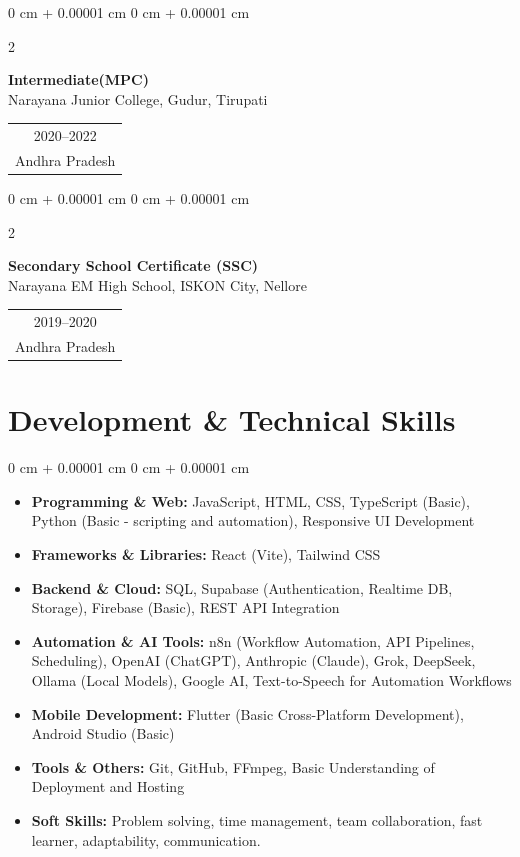 \documentclass[10pt, a4paper]{article}
\makeatletter
\newenvironment{highlights}{
    \begin{itemize}[
        topsep=0.06 cm,
        parsep=0.04 cm,
        partopsep=0pt,
        itemsep=0.02 cm,
        leftmargin=0 cm + 10pt
    ]
}{
    \end{itemize}
}
\newenvironment{onecolentry}{
    \begin{adjustwidth}{
        0 cm + 0.00001 cm
    }{
        0 cm + 0.00001 cm
    }
}{
    \end{adjustwidth}
}
\newenvironment{twocolentry}[2][4.5 cm]{
    \onecolentry
    \def\secondColumn{#2}
    \setcolumnwidth{\fill, #1}
    \begin{paracol}{2}
}{
    \switchcolumn \raggedleft \secondColumn
    \end{paracol}
    \endonecolentry
}
\newcommand{\eduDateBlock}[2]{
    \begin{tabular}[t]{@{}c@{}}
        \normalsize #1 \\
        \normalsize #2
    \end{tabular}
}
\makeatother
\begin{document}
    \vspace{0.10 cm}
    \begin{twocolentry}{
        \eduDateBlock{2020--2022}{Andhra Pradesh}
    }
        \textbf{Intermediate(MPC)}\\
        Narayana Junior College, Gudur, Tirupati
    \end{twocolentry}

    \vspace{0.10 cm}
    \begin{twocolentry}{
        \eduDateBlock{2019--2020}{Andhra Pradesh}
    }
        \textbf{Secondary School Certificate (SSC)}\\
        Narayana EM High School, ISKON City, Nellore
    \end{twocolentry}

    \section{Development \& Technical Skills}

    \begin{onecolentry}
        \begin{highlights}
            \item \textbf{Programming \& Web:} JavaScript, HTML, CSS, TypeScript (Basic), Python (Basic - scripting and automation), Responsive UI Development
            \item \textbf{Frameworks \& Libraries:} React (Vite), Tailwind CSS
            \item \textbf{Backend \& Cloud:} SQL, Supabase (Authentication, Realtime DB, Storage), Firebase (Basic), REST API Integration
            \item \textbf{Automation \& AI Tools:} n8n (Workflow Automation, API Pipelines, Scheduling), OpenAI (ChatGPT), Anthropic (Claude), Grok, DeepSeek, Ollama (Local Models), Google AI, Text-to-Speech for Automation Workflows
            \item \textbf{Mobile Development:} Flutter (Basic Cross-Platform Development), Android Studio (Basic)
            \item \textbf{Tools \& Others:} Git, GitHub, FFmpeg, Basic Understanding of Deployment and Hosting
            \item \textbf{Soft Skills:} Problem solving, time management, team collaboration, fast learner, adaptability, communication.
        \end{highlights}
    \end{onecolentry}
\end{document}
